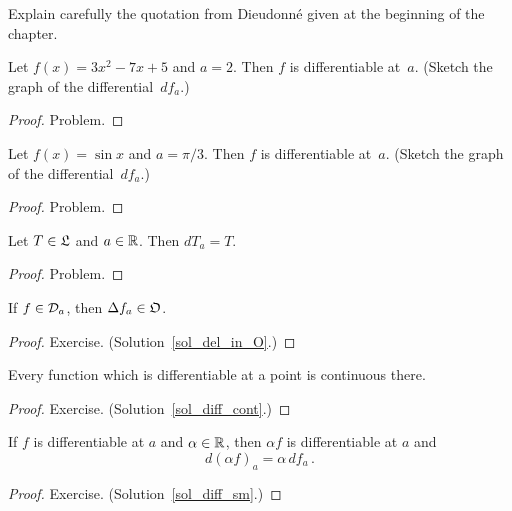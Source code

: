 \begin{prob} Explain carefully the quotation from Dieudonn\'e given at the beginning of the chapter.
\end{prob}

\begin{exam} Let $f(x) =3x^2 - 7x + 5$ and $a=2$. Then $f$ is differentiable at~$a$.  (Sketch the
graph of the differential~$df_a$.)
\end{exam}

\begin{proof} Problem.  \ns  \end{proof}

\begin{exam} Let $f(x) = \sin x$ and $a = \pi/3$.  Then $f$ is differentiable at~$a$.  (Sketch the
graph of the differential~$df_a$.)
\end{exam}

\begin{proof} Problem.  \ns  \end{proof}

\begin{prop} Let $T \in \mathfrak{L}$ and $a \in \mathbb{R}$. Then $dT_a = T$.
\end{prop}

\begin{proof} Problem.  \ns  \end{proof}

\begin{prop}\label{del_in_O} If $f \in \mathcal{D}_a$, then $\Delta f_a \in \mathfrak{O}$.
\end{prop}

\begin{proof} Exercise.   (Solution~\ref{sol_del_in_O}.) \ns \end{proof}

\begin{cor}\label{diff_cont} Every function which is differentiable at a point is continuous there.
\end{cor}

\begin{proof} Exercise.  (Solution~\ref{sol_diff_cont}.)    \ns \end{proof}

\begin{prop}\label{diff_sm} If $f$ is differentiable at $a$ and $\alpha \in \mathbb{R}$, then $\alpha f$
is differentiable at $a$ and
   \[ d(\alpha f)_a = \alpha\,df_a\,. \]
\end{prop}

\begin{proof} Exercise.  (Solution~\ref{sol_diff_sm}.)   \ns \end{proof}

